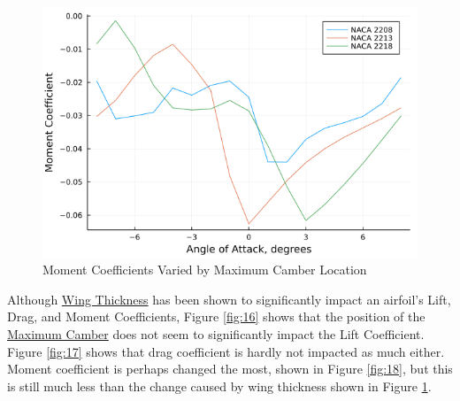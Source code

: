 \documentclass{article}
\begin{document}
\begin{figure}[!htb]
  \includegraphics[width=\linewidth]{Figure15.png}
  \caption{Moment Coefficients Varied by Maximum Camber Location}\label{fig:15}
\endminipage
\end{figure}

Although \hyperlink{Th}{Wing Thickness} has been shown to significantly impact an airfoil's Lift, Drag, and Moment Coefficients, Figure \ref{fig:16} shows that the position of the \hyperlink{Camber}{Maximum Camber} does not seem to significantly impact the Lift Coefficient. Figure \ref{fig:17} shows that drag coefficient is hardly not impacted as much either. Moment coefficient is perhaps changed the most, shown in Figure \ref{fig:18}, but this is still much less than the change caused by wing thickness shown in Figure \ref{fig:15}.
\end{document}
